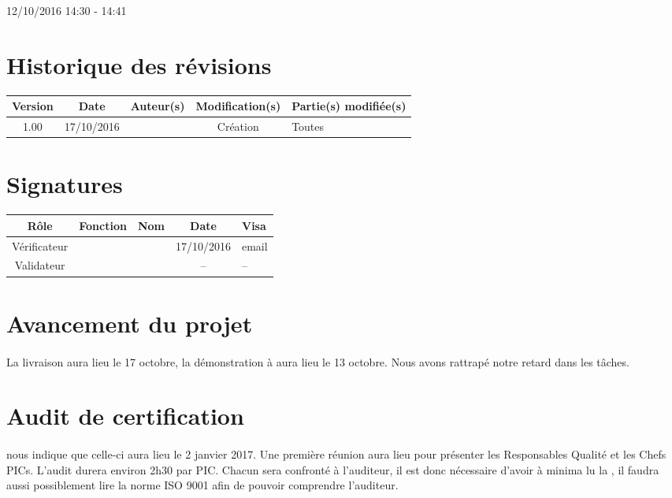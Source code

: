 \documentclass [a4paper] {article}
\begin{document}
\rhead{}

12/10/2016
\hfill   
\hfill 	14:30 - 14:41 				%



\section*{Historique des révisions}
\begin{center}
			\begin{tabular}{| c | c | c | c | p{4cm} |}
				\hline
				\rowcolor{Gray}
				Version & Date & Auteur(s) & Modification(s) & Partie(s) modifiée(s)		 \\
				\hline
				1.00 & 17/10/2016 & \Kafui & Création & Toutes \\
		\hline		
			\end{tabular}
		\end{center}

\section*{Signatures}

		\begin{center}
			\begin{tabular}{| c | c | c | c | p{4cm} |}
				\hline
				\rowcolor{Gray}
				Rôle & Fonction & Nom & Date & Visa		 \\
				\hline
				Vérificateur & \RGC & \Melissa & 17/10/2016 & email \\[30pt]
				\hline
				Validateur & \CP & \Pierre & -- & -- \\[30pt]	
				\hline
			\end{tabular}
		\end{center}


\section{Avancement du projet}
\paragraph*{}
La livraison aura lieu le 17 octobre, la démonstration à \nomTuteurPedago{} aura lieu le 13 octobre. Nous avons rattrapé notre retard dans les tâches. 

\section{Audit de certification}
\paragraph*{}
\nomTuteurQualite{} nous indique que celle-ci aura lieu le 2 janvier 2017. Une première réunion aura lieu pour présenter les Responsables Qualité et les Chefs PICs. L'audit durera environ 2h30 par PIC.
Chacun sera confronté à l'auditeur, il est donc nécessaire d'avoir à minima lu la , il faudra aussi possiblement lire la norme ISO 9001 afin de pouvoir comprendre l'auditeur.
\end{document}
